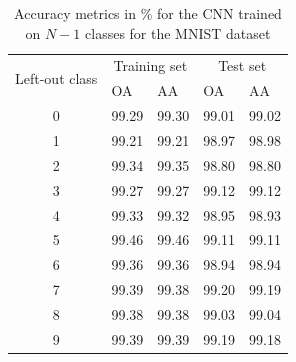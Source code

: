 \documentclass[10pt]{article}
\begin{document}
\begin{table}[H]
\centering
    \begin{tabular}{cllll}
    \toprule
    \multirow{2}{*}{Left-out class} & \multicolumn{2}{c}{Training set} & \multicolumn{2}{c}{Test set} \\
                   & \gls{OA}    & \gls{AA}     & \gls{OA}    & \gls{AA}     \\\midrule
    0              & 99.29 & 99.30 & 99.01 & 99.02 \\
    1              & 99.21 & 99.21 & 98.97 & 98.98 \\
    2              & 99.34 & 99.35 & 98.80 & 98.80 \\
    3              & 99.27 & 99.27 & 99.12 & 99.12 \\
    4              & 99.33 & 99.32 & 98.95 & 98.93 \\
    5              & 99.46 & 99.46 & 99.11 & 99.11 \\
    6              & 99.36 & 99.36 & 98.94 & 98.94 \\
    7              & 99.39 & 99.38 & 99.20 & 99.19 \\
    8              & 99.38 & 99.38 & 99.03 & 99.04 \\
    9              & 99.39 &  99.39 &  99.19 &  99.18\\\bottomrule
    \end{tabular}
    \caption{Accuracy metrics in \% for the \gls{CNN} trained on $N-1$ classes for the \gls{MNIST} dataset}
    \label{table:mnist-nd-accuracy}
\end{table}
\end{document}
